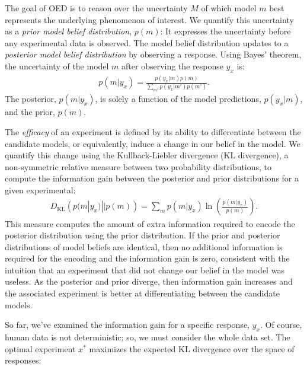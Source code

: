\documentclass{article}
\begin{document}
The goal of OED is to reason over the uncertainty $M$ of which model $m$ best represents the underlying phenomenon of interest. We quantify this uncertainty as a \emph{prior model belief distribution}, $p(m)$: It expresses the uncertainty before any experimental data is observed.
The model belief distribution updates to a \emph{posterior model belief distribution} by observing a response. Using Bayes' theorem, the uncertainty of the model $m$ after observing the response $y_x$ is:
\begin{align}
p(m|y_x) = \frac{p(y_x|m)p(m)}{\sum\limits_{m'} p(y_x|m')p(m')}. \label{eq:bayes}
\end{align}
The posterior, $p(m|y_x)$, is solely a function of the model predictions, $p(y_x|m)$, and the prior, $p(m)$.

The \emph{efficacy} of an experiment is defined by its ability to differentiate between the candidate models, or equivalently, induce a change in our belief in the model. We quantify this change using the Kullback-Liebler divergence (KL divergence), a non-symmetric relative measure between two probability distributions, to compute the information gain between the posterior and prior distributions for a given experimental:
\begin{align}
D_{\text{KL}}\left(p(m|y_x) || p(m)\right) = \sum\limits_m p(m|y_x) \ln \left( \frac{p(m|y_x)}{p(m)}\right). \label{eq:kl}
\end{align}
This measure computes the amount of extra information required to encode the posterior distribution using the prior distribution. If the prior and posterior distributions of model beliefs are identical, then no additional information is required for the encoding and the information gain is zero, consistent with the intuition that an experiment that did not change our belief in the model was useless. As the posterior and prior diverge, then information gain increases and the associated experiment is better at differentiating between the candidate models.

So far, we've examined the information gain for a specific response, $y_x$.
Of course, human data is not deterministic; so, we must consider the whole data set.
The optimal experiment $x^*$ maximizes the expected KL divergence over the space of responses:
\end{document}
